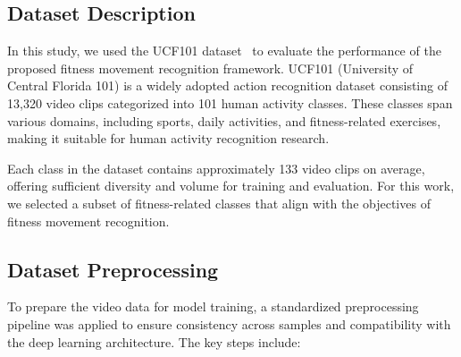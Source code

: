 \documentclass[conference]{IEEEtran}
\begin{document}
\subsection{Dataset Description}
In this study, we used the UCF101 dataset~\cite{soomro2012} to evaluate the performance of the proposed fitness movement recognition framework. UCF101 (University of Central Florida 101) is a widely adopted action recognition dataset consisting of 13,320 video clips categorized into 101 human activity classes. These classes span various domains, including sports, daily activities, and fitness-related exercises, making it suitable for human activity recognition research.

Each class in the dataset contains approximately 133 video clips on average, offering sufficient diversity and volume for training and evaluation. For this work, we selected a subset of fitness-related classes that align with the objectives of fitness movement recognition.
\subsection{Dataset Preprocessing}
To prepare the video data for model training, a standardized preprocessing pipeline was applied to ensure consistency across samples and compatibility with the deep learning architecture. The key steps include:
\end{document}
